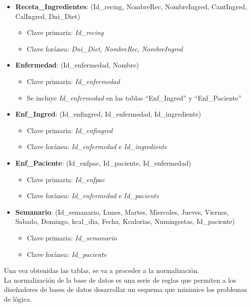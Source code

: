 \begin{itemize}
\begin{itemize}
\end{itemize}
\item \textbf{Receta\_Ingredientes}: (Id\_recing, NombreRec, NombreIngred, CantIngred, CalIngred, Dni\_Diet)
\begin{itemize}
\item Clave primaria: \textit{Id\_recing}
\item Clave foránea: \textit{Dni\_Diet}, \textit{NombreRec}, \textit{NombreIngred}
\end{itemize}
\item \textbf{Enfermedad}: (Id\_enfermedad, Nombre)
\begin{itemize}
\item Clave primaria: \textit{Id\_enfermedad}
\item Se incluye \textit{Id\_enfermedad} en las tablas ``Enf\_Ingred'' y ``Enf\_Paciente''
\end{itemize}
\item \textbf{Enf\_Ingred}: (Id\_enfingred, Id\_enfermedad, Id\_ingrediente)
\begin{itemize}
\item Clave primaria: \textit{Id\_enfingred}
\item Clave foránea: \textit{Id\_enfermedad} e \textit{Id\_ingrediente}
\end{itemize}
\item \textbf{Enf\_Paciente}: (Id\_enfpac, Id\_paciente, Id\_enfermedad)
\begin{itemize}
\item Clave primaria: \textit{Id\_enfpac}
\item Clave foránea: \textit{Id\_enfermedad} e \textit{Id\_paciente}
\end{itemize}
\item \textbf{Semanario}: (Id\_semanario, Lunes, Martes, Miercoles, Jueves, Viernes, Sabado, Domingo, kcal\_dia, Fecha, Kcalorias, Numingestas, Id\_paciente)
\begin{itemize}
\item Clave primaria: \textit{Id\_semanario}
\item Clave foránea: \textit{Id\_paciente}
\end{itemize}
\end{itemize}
Una vez obtenidas las tablas, se va a proceder a la normalización.\\
La normalización de la base de datos es una serie de reglas que permiten a los diseñadores de bases de datos desarrollar un esquema que minimice los problemas de lógica.\\
